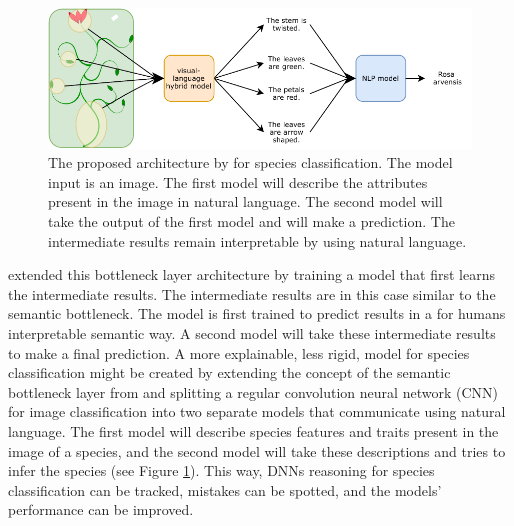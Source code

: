 \documentclass[a4paper, 12pt, oneside]{book} %
\begin{document}
\begin{figure} [tbp]
    \centering
    \vspace{0cm}
    \includegraphics[width=\textwidth]{architecture.pdf}
    \caption[Proposed architecture]{The proposed architecture by \textcite{ishikawa_contextual_2021} for species classification. The model input is an image. The first model will describe the attributes present in the image in natural language. The second model will take the output of the first model and will make a prediction. The intermediate results remain interpretable by using natural language.}
    \label{fig:intro}
\end{figure}

\textcite{ishikawa_contextual_2021} extended this bottleneck layer architecture by training a model that first learns the intermediate results.
The intermediate results are in this case similar to the semantic bottleneck.
The model is first trained to predict results in a for humans interpretable semantic way.
A second model will take these intermediate results to make a final prediction.
A more explainable, less rigid, model for species classification might be created by extending the concept of the semantic bottleneck layer from \textcite{ishikawa_contextual_2021} and splitting a regular convolution neural network (CNN) for image classification into two separate models that communicate using natural language.
The first model will describe species features and traits present in the image of a species, and the second model will take these descriptions and tries to infer the species (see Figure \ref{fig:intro}).
This way, DNNs reasoning for species classification can be tracked, mistakes can be spotted, and the models' performance can be improved.
\end{document}
